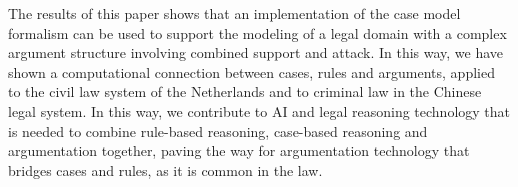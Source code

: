 \documentclass{IOS-Book-Article}
\begin{document}
The results of this paper shows that an implementation of the case model formalism can be used to support the modeling of a legal domain with a complex argument structure involving combined support and attack. In this way, we have shown a computational connection between cases, rules and arguments, applied to the civil law system of the Netherlands and to criminal law in the Chinese legal system. 
In this way, we contribute to AI and legal reasoning technology that is needed to combine rule-based reasoning, case-based reasoning and argumentation together, paving the way for argumentation technology that bridges cases and rules, as it is common in the law.

\footnotesize


\end{document}
